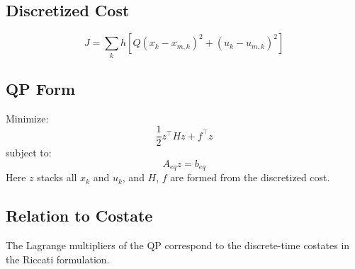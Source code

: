 \documentclass[11pt]{article}
\begin{document}
\subsection*{Discretized Cost}

\[
J = \sum_k h \left[ Q (x_k - x_{m,k})^2 + (u_k - u_{m,k})^2 \right]
\]
\subsection*{QP Form}

Minimize:
\[
\frac{1}{2} z^\top H z + f^\top z
\]
subject to:
\[
A_{eq} z = b_{eq}
\]
Here $z$ stacks all $x_k$ and $u_k$, and $H$, $f$ are formed from the discretized cost.

\subsection*{Relation to Costate}

The Lagrange multipliers of the QP correspond to the discrete-time costates in the Riccati formulation.
\end{document}
